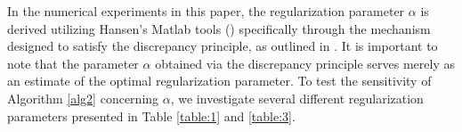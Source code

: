 \documentclass[a4paper,12pt]{article}
\numberwithin{equation}{section}
\begin{document}
\par In the numerical experiments in this paper, the regularization parameter $\alpha$ is derived utilizing Hansen's Matlab tools (\cite{H07}) specifically through the mechanism designed to satisfy the discrepancy principle, as outlined in \cite{AR10,WLHC19}. It is important to note that the parameter $\alpha$ obtained via the discrepancy principle serves merely as an estimate of the optimal regularization parameter. To test the sensitivity of Algorithm \ref{alg2} concerning $\alpha$, we investigate several different regularization parameters presented in Table \ref{table:1} and \ref{table:3}.

\end{document}

